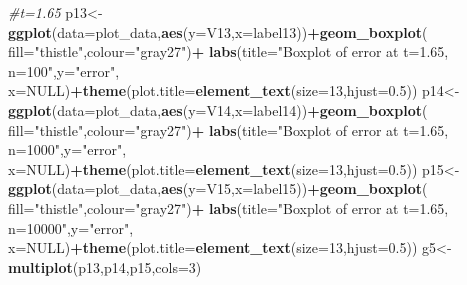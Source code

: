 \documentclass[
]{article}
\newenvironment{Shaded}{\begin{snugshade}}{\end{snugshade}}
\newcommand{\CommentTok}[1]{\textcolor[rgb]{0.56,0.35,0.01}{\textit{#1}}}
\newcommand{\DataTypeTok}[1]{\textcolor[rgb]{0.13,0.29,0.53}{#1}}
\newcommand{\DecValTok}[1]{\textcolor[rgb]{0.00,0.00,0.81}{#1}}
\newcommand{\FloatTok}[1]{\textcolor[rgb]{0.00,0.00,0.81}{#1}}
\newcommand{\KeywordTok}[1]{\textcolor[rgb]{0.13,0.29,0.53}{\textbf{#1}}}
\newcommand{\NormalTok}[1]{#1}
\newcommand{\OperatorTok}[1]{\textcolor[rgb]{0.81,0.36,0.00}{\textbf{#1}}}
\newcommand{\OtherTok}[1]{\textcolor[rgb]{0.56,0.35,0.01}{#1}}
\newcommand{\StringTok}[1]{\textcolor[rgb]{0.31,0.60,0.02}{#1}}
\begin{document}
\begin{Shaded}
\begin{Highlighting}[]
\CommentTok{#t=1.65}
\NormalTok{p13<-}\KeywordTok{ggplot}\NormalTok{(}\DataTypeTok{data=}\NormalTok{plot_data,}\KeywordTok{aes}\NormalTok{(}\DataTypeTok{y=}\NormalTok{V13,}\DataTypeTok{x=}\NormalTok{label13))}\OperatorTok{+}\KeywordTok{geom_boxplot}\NormalTok{(}
  \DataTypeTok{fill=}\StringTok{"thistle"}\NormalTok{,}\DataTypeTok{colour=}\StringTok{"gray27"}\NormalTok{)}\OperatorTok{+}
\StringTok{  }\KeywordTok{labs}\NormalTok{(}\DataTypeTok{title=}\StringTok{"Boxplot of error at t=1.65, n=100"}\NormalTok{,}\DataTypeTok{y=}\StringTok{"error"}\NormalTok{,}
       \DataTypeTok{x=}\OtherTok{NULL}\NormalTok{)}\OperatorTok{+}\KeywordTok{theme}\NormalTok{(}\DataTypeTok{plot.title=}\KeywordTok{element_text}\NormalTok{(}\DataTypeTok{size=}\DecValTok{13}\NormalTok{,}\DataTypeTok{hjust=}\FloatTok{0.5}\NormalTok{))}
\NormalTok{p14<-}\KeywordTok{ggplot}\NormalTok{(}\DataTypeTok{data=}\NormalTok{plot_data,}\KeywordTok{aes}\NormalTok{(}\DataTypeTok{y=}\NormalTok{V14,}\DataTypeTok{x=}\NormalTok{label14))}\OperatorTok{+}\KeywordTok{geom_boxplot}\NormalTok{(}
  \DataTypeTok{fill=}\StringTok{"thistle"}\NormalTok{,}\DataTypeTok{colour=}\StringTok{"gray27"}\NormalTok{)}\OperatorTok{+}
\StringTok{  }\KeywordTok{labs}\NormalTok{(}\DataTypeTok{title=}\StringTok{"Boxplot of error at t=1.65, n=1000"}\NormalTok{,}\DataTypeTok{y=}\StringTok{"error"}\NormalTok{,}
       \DataTypeTok{x=}\OtherTok{NULL}\NormalTok{)}\OperatorTok{+}\KeywordTok{theme}\NormalTok{(}\DataTypeTok{plot.title=}\KeywordTok{element_text}\NormalTok{(}\DataTypeTok{size=}\DecValTok{13}\NormalTok{,}\DataTypeTok{hjust=}\FloatTok{0.5}\NormalTok{))}
\NormalTok{p15<-}\KeywordTok{ggplot}\NormalTok{(}\DataTypeTok{data=}\NormalTok{plot_data,}\KeywordTok{aes}\NormalTok{(}\DataTypeTok{y=}\NormalTok{V15,}\DataTypeTok{x=}\NormalTok{label15))}\OperatorTok{+}\KeywordTok{geom_boxplot}\NormalTok{(}
  \DataTypeTok{fill=}\StringTok{"thistle"}\NormalTok{,}\DataTypeTok{colour=}\StringTok{"gray27"}\NormalTok{)}\OperatorTok{+}
\StringTok{  }\KeywordTok{labs}\NormalTok{(}\DataTypeTok{title=}\StringTok{"Boxplot of error at t=1.65, n=10000"}\NormalTok{,}\DataTypeTok{y=}\StringTok{"error"}\NormalTok{,}
       \DataTypeTok{x=}\OtherTok{NULL}\NormalTok{)}\OperatorTok{+}\KeywordTok{theme}\NormalTok{(}\DataTypeTok{plot.title=}\KeywordTok{element_text}\NormalTok{(}\DataTypeTok{size=}\DecValTok{13}\NormalTok{,}\DataTypeTok{hjust=}\FloatTok{0.5}\NormalTok{))}
\NormalTok{g5<-}\KeywordTok{multiplot}\NormalTok{(p13,p14,p15,}\DataTypeTok{cols=}\DecValTok{3}\NormalTok{)}


\end{Highlighting}
\end{Shaded}
\end{document}
